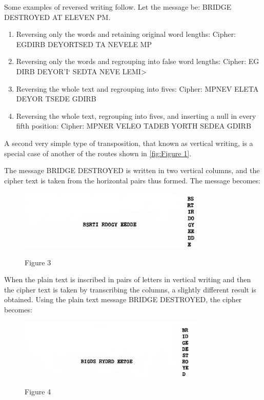 \mypara Some examples of reversed writing follow. Let the message be:
BRIDGE DESTROYED AT ELEVEN PM.

\begin{enumerate}
\item Reversing only the words and retaining original word lengths:
Cipher: EGDIRB DEYORTSED TA NEVELE MP
\item Reversing only the words and regrouping into false word
lengths:
Cipher: EG DIRB DEYOR'I‘ SEDTA NEVE LEMI>
\item Reversing the whole text and regrouping into fives:
Cipher: MPNEV ELETA DEYOR TSEDE GDIRB
\item Reversing the whole text, regrouping into fives, and inserting
a null in every fifth position:
Cipher: MPNER VELEO TADEB YORTH SEDEA GDIRB
\end{enumerate}

\mypara A second very simple type of transposition, that known as vertical
writing, is a special case of another of the routes shown in \ref{fig:Figure 1}.

The message BRIDGE DESTROYED is written in two vertical
columns, and the cipher text is taken from the horizontal pairs
thus formed. The message becomes:

\begin{figure}[h]
  \centering
    \includegraphics[width=0.8\textwidth,natwidth=438,natheight=139]{Chapter2_Figure3.png}
    \label{fig:Figure 3}
    \caption{Figure 3}
\end{figure}

When the plain text is inscribed in pairs of letters in vertical
writing and then the cipher text is taken by transcribing the
columns, a slightly different result is obtained. Using the plain
text message BRIDGE DESTROYED, the cipher becomes:

\begin{figure}[h]
  \centering
    \includegraphics[width=0.8\textwidth,natwidth=454,natheight=144]{Chapter2_Figure4.png}
    \label{fig:Figure 4}
    \caption{Figure 4}
\end{figure}

